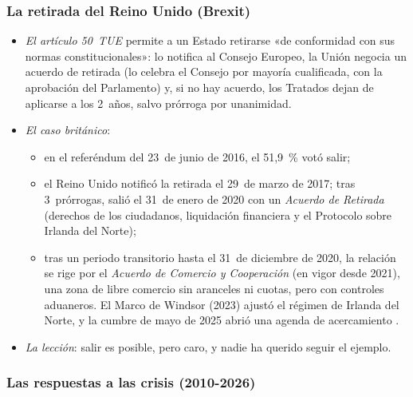 \documentclass[11pt]{article}
\begin{document}
\subsubsection{La retirada del Reino Unido (Brexit)}\label{sec:brexit}

\begin{itemize}
\item \emph{El artículo 50~TUE} permite a un Estado retirarse «de conformidad con sus normas constitucionales»: lo notifica al Consejo Europeo, la Unión negocia un acuerdo de retirada (lo celebra el Consejo por mayoría cualificada, con la aprobación del Parlamento) y, si no hay acuerdo, los Tratados dejan de aplicarse a los 2~años, salvo prórroga por unanimidad.
\item \emph{El caso británico}:
  \begin{itemize}
  \item en el referéndum del 23~de junio de 2016, el 51,9~\% votó salir;
  \item el Reino Unido notificó la retirada el 29~de marzo de 2017; tras 3~prórrogas, salió el 31~de enero de 2020 con un \emph{Acuerdo de Retirada} (derechos de los ciudadanos, liquidación financiera y el Protocolo sobre Irlanda del Norte)\nocite{UE2020Retirada};
  \item tras un periodo transitorio hasta el 31~de diciembre de 2020, la relación se rige por el \emph{Acuerdo de Comercio y Cooperación} (en vigor desde 2021), una zona de libre comercio sin aranceles ni cuotas, pero con controles aduaneros. El Marco de Windsor (2023) ajustó el régimen de Irlanda del Norte, y la cumbre de mayo de 2025 abrió una agenda de acercamiento  .
  \end{itemize}
\item \emph{La lección}: salir es posible, pero caro, y nadie ha querido seguir el ejemplo.
\end{itemize}

\subsubsection{Las respuestas a las crisis (2010-2026)}\label{sec:crisis-recientes}
\end{document}
